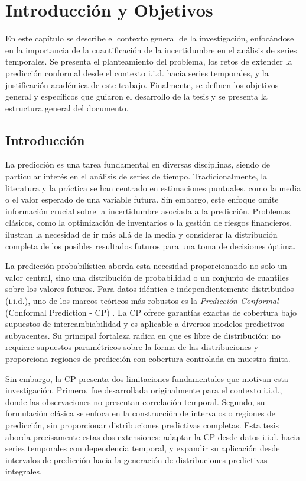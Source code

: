 \chapter{Introducción y Objetivos}
\label{cap:introduccion}

En este capítulo se describe el contexto general de la investigación, enfocándose en la importancia de la cuantificación de la incertidumbre en el análisis de series temporales. Se presenta el planteamiento del problema, los retos de extender la predicción conformal desde el contexto i.i.d. hacia series temporales, y la justificación académica de este trabajo. Finalmente, se definen los objetivos general y específicos que guiaron el desarrollo de la tesis y se presenta la estructura general del documento.

\section{Introducción}

La predicción es una tarea fundamental en diversas disciplinas, siendo de particular interés en el análisis de series de tiempo. Tradicionalmente, la literatura y la práctica se han centrado en estimaciones puntuales, como la media o el valor esperado de una variable futura. Sin embargo, este enfoque omite información crucial sobre la incertidumbre asociada a la predicción. Problemas clásicos, como la optimización de inventarios o la gestión de riesgos financieros, ilustran la necesidad de ir más allá de la media y considerar la distribución completa de los posibles resultados futuros para una toma de decisiones óptima.

La predicción probabilística aborda esta necesidad proporcionando no solo un valor central, sino una distribución de probabilidad o un conjunto de cuantiles sobre los valores futuros. Para datos idéntica e independientemente distribuidos (i.i.d.), uno de los marcos teóricos más robustos es la \textit{Predicción Conformal} (Conformal Prediction - CP) \parencite{Vovk2005}. La CP ofrece garantías exactas de cobertura bajo supuestos de intercambiabilidad y es aplicable a diversos modelos predictivos subyacentes. Su principal fortaleza radica en que es libre de distribución: no requiere supuestos paramétricos sobre la forma de las distribuciones y proporciona regiones de predicción con cobertura controlada en muestra finita.

Sin embargo, la CP presenta dos limitaciones fundamentales que motivan esta investigación. Primero, fue desarrollada originalmente para el contexto i.i.d., donde las observaciones no presentan correlación temporal. Segundo, su formulación clásica se enfoca en la construcción de intervalos o regiones de predicción, sin proporcionar distribuciones predictivas completas. Esta tesis aborda precisamente estas dos extensiones: adaptar la CP desde datos i.i.d. hacia series temporales con dependencia temporal, y expandir su aplicación desde intervalos de predicción hacia la generación de distribuciones predictivas integrales.


